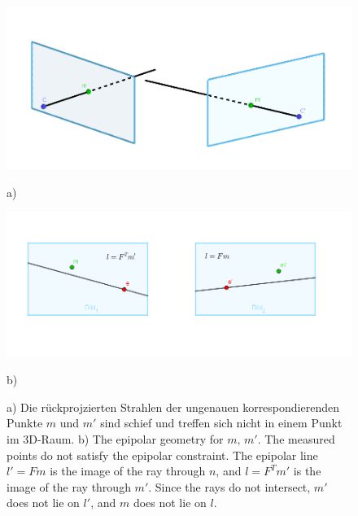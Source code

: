 \begin{figure}[!htb]
	\includegraphics[width=\linewidth]{images/problemTriangulation.png}
	\caption{a)}
	\label{fig:awesome_image1}
	\endminipage\hfill
	\includegraphics[width=\linewidth]{images/SampsAppx.png}
	\caption{b)}
	\label{fig:awesome_image2}
	\endminipage\hfill
	\caption{ a) Die rückprojzierten Strahlen der ungenauen korrespondierenden Punkte $m$ und $m'$ sind schief und treffen sich nicht in einem Punkt im 3D-Raum. b) The epipolar geometry for $m,\, m'$. The measured points do not satisfy the epipolar constraint.	The epipolar line $l' = Fm$ is the image of the ray through $n$, and $l = F^Tm'$ is the image of the ray through $m'$. Since the rays do not intersect, $m'$ does not lie on $l'$, and $m$ does not lie on $l$.}
\end{figure}


